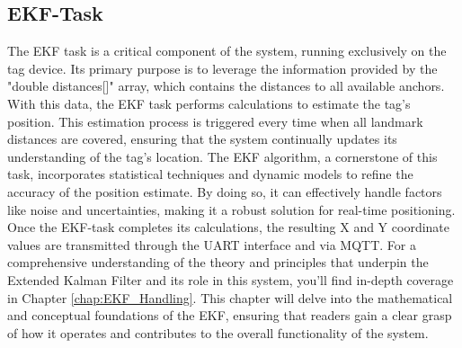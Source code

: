 \subsection{EKF-Task}
The EKF task is a critical component of the system, running exclusively on the tag device. 
Its primary purpose is to leverage the information provided by the "double distances[]" array, which contains the distances to all available anchors. 
With this data, the EKF task performs calculations to estimate the tag's position. 
This estimation process is triggered every time when all landmark distances are covered, ensuring that the system continually updates its understanding of the tag's location.
\vspace{4pt}
\newline
The EKF algorithm, a cornerstone of this task, incorporates statistical techniques and dynamic models to refine the accuracy of the position estimate. 
By doing so, it can effectively handle factors like noise and uncertainties, making it a robust solution for real-time positioning.
\vspace{4pt}
\newline
Once the EKF-task completes its calculations, the resulting X and Y coordinate values are transmitted through the UART interface and via MQTT.  
\vspace{4pt}
\newline
For a comprehensive understanding of the theory and principles that underpin the Extended Kalman Filter and its role in this system, you'll find in-depth coverage in Chapter \ref{chap:EKF_Handling}. 
This chapter will delve into the mathematical and conceptual foundations of the EKF, ensuring that readers gain a clear grasp of how it operates and contributes to the overall functionality of the system.

